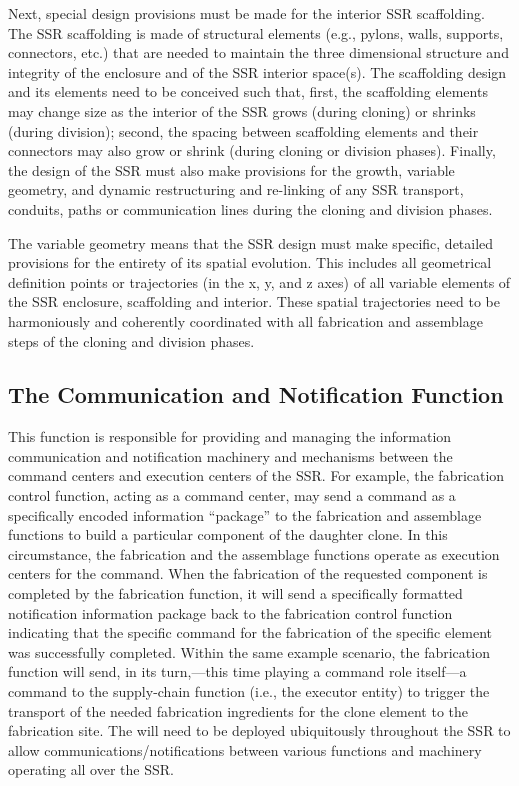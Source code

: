 Next, special design provisions must be made for the interior SSR
scaffolding. The SSR scaffolding is made of structural
elements (e.g., pylons, walls, supports, connectors, etc.) that are needed to
maintain the three dimensional structure and integrity of the enclosure
and of the SSR interior space(s). The scaffolding design and its
elements need to be conceived such that, first, the scaffolding elements may
change size as the
interior of the SSR grows (during cloning) or shrinks (during division);
second, the spacing between scaffolding elements and their connectors may
also grow or shrink (during cloning or division phases).  
Finally, the design of the SSR must also make provisions for the growth,
variable geometry, and dynamic restructuring and re-linking of any SSR
transport, conduits, paths or communication lines during the cloning
and division phases.

The variable geometry means that the SSR design must make specific,
detailed provisions for the entirety of its spatial evolution. This includes all geometrical
definition points or trajectories (in the x, y, and z axes) of all variable
elements of the SSR enclosure, scaffolding and interior. These spatial
trajectories need to be harmoniously and coherently coordinated with
all fabrication and assemblage steps of the cloning and division
phases.

\subsection[The Communication and Notification Function]{The Communication and Notification Function}

This function is responsible for
providing and managing the information communication and notification
machinery and mechanisms between the command centers and execution
centers of the SSR. For example, the fabrication control 
function, acting as a command center, may send a command as a specifically
encoded information “package”  to the fabrication and assemblage
functions to build a particular component of the daughter clone. In
this circumstance, the fabrication and the assemblage functions operate
as execution centers for the command. When the fabrication of the
requested component is completed by the fabrication function, it will
send a specifically formatted notification information package back to
the fabrication control function indicating that the specific
command for the fabrication of the specific element was successfully
completed. Within the same example scenario, the fabrication function
will send, in its turn,---this time playing a command role itself---a
command to the supply-chain function (i.e., the executor entity) to trigger
the transport of the needed fabrication ingredients for the clone
element to the fabrication site. The  
will need to be deployed ubiquitously throughout the
SSR to allow communications/notifications between various functions and
machinery operating all over the SSR.

